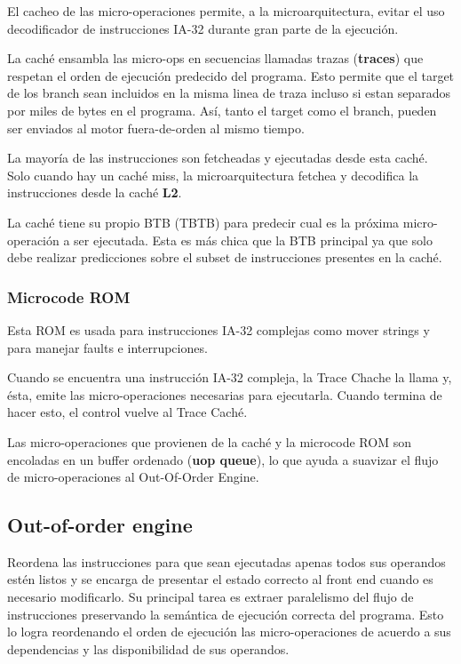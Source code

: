 El cacheo de las micro-operaciones permite, a la microarquitectura, evitar el uso decodificador de instrucciones IA-32 durante gran parte de la ejecución.

La caché ensambla las micro-ops en secuencias llamadas trazas (\textbf{traces}) que respetan el orden de ejecución predecido del programa. Esto permite que el target de los branch sean incluidos en la misma linea de traza incluso si estan separados por miles de bytes en el programa. Así, tanto el target como el branch, pueden ser enviados al motor fuera-de-orden al mismo tiempo.

La mayoría de las instrucciones son fetcheadas y ejecutadas desde esta caché. Solo cuando hay un caché miss, la microarquitectura fetchea y decodifica la instrucciones desde la caché \textbf{L2}.

La caché tiene su propio BTB (TBTB) para predecir cual es la próxima micro-operación a ser ejecutada. Esta es más chica que la BTB principal ya que solo debe realizar predicciones sobre el subset de instrucciones presentes en la caché.

\subsubsection*{Microcode ROM}
Esta ROM es usada para instrucciones IA-32 complejas como mover strings y para manejar faults e interrupciones.

Cuando se encuentra una instrucción IA-32 compleja, la Trace Chache la llama y, ésta, emite las micro-operaciones necesarias para ejecutarla. Cuando termina de hacer esto, el control vuelve al Trace Caché.

Las micro-operaciones que provienen de la caché y la microcode ROM son encoladas en un buffer ordenado (\textbf{uop queue}), lo que ayuda a suavizar el flujo de micro-operaciones al Out-Of-Order Engine.

\subsection{Out-of-order engine}
Reordena las instrucciones para que sean ejecutadas apenas todos sus operandos estén listos y se encarga de presentar el estado correcto al front end cuando es necesario modificarlo. Su principal tarea es extraer paralelismo del flujo de instrucciones preservando la semántica de ejecución correcta del programa. Esto lo logra reordenando el orden de ejecución las micro-operaciones de acuerdo a sus dependencias y las disponibilidad de sus operandos.


